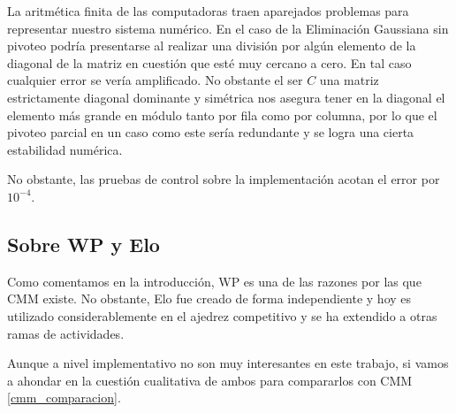 La aritmética finita de las computadoras traen aparejados problemas para representar nuestro sistema numérico. En el caso de la Eliminación Gaussiana sin pivoteo podría presentarse al realizar una división por algún elemento de la diagonal de la matriz en cuestión que esté muy cercano a cero. En tal caso cualquier error se vería amplificado. No obstante el ser $C$ una matriz estrictamente diagonal dominante y simétrica nos asegura tener en la diagonal el elemento más grande en módulo tanto por fila como por columna, por lo que el pivoteo parcial en un caso como este sería redundante y se logra una cierta estabilidad numérica.

No obstante, las pruebas de control sobre la implementación acotan el error por $10^{-4}$.

\subsection{Sobre WP y Elo}

Como comentamos en la introducción, WP es una de las razones por las que CMM existe. No obstante, Elo fue creado de forma independiente y hoy es utilizado considerablemente en el ajedrez competitivo y se ha extendido a otras ramas de actividades.

Aunque a nivel implementativo no son muy interesantes en este trabajo, si vamos a ahondar en la cuestión cualitativa de ambos para compararlos con CMM \ref{cmm_comparacion}.